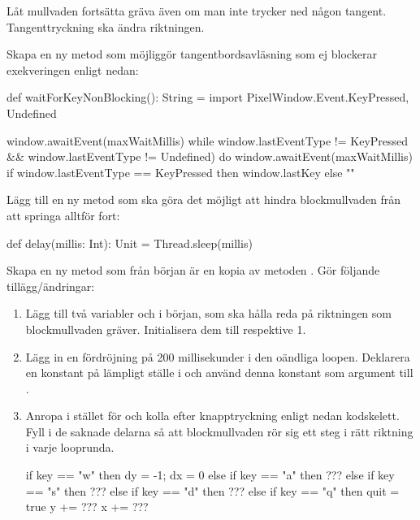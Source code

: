 \Task
Låt mullvaden fortsätta gräva även om man inte trycker ned någon tangent. Tangenttryckning ska ändra riktningen.

\Subtask
Skapa en ny metod  som möjliggör tangentbordsavläsning som ej blockerar exekveringen enligt nedan:

\begin{Code}
  def waitForKeyNonBlocking(): String  = 
    import PixelWindow.Event.{KeyPressed, Undefined}

    window.awaitEvent(maxWaitMillis)
    while 
      window.lastEventType != KeyPressed  &&
      window.lastEventType != Undefined) 
    do window.awaitEvent(maxWaitMillis)
    if window.lastEventType == KeyPressed then window.lastKey else ""
\end{Code}

\Subtask
Lägg till en ny metod  som ska göra det möjligt att hindra blockmullvaden från att springa alltför fort:
\begin{Code}
  def delay(millis: Int): Unit = Thread.sleep(millis)
\end{Code}


\Subtask
Skapa en ny metod  som från början är en kopia av metoden . Gör följande tillägg/ändringar:
\begin{enumerate}

\item Lägg till två variabler  och  i början, som ska hålla reda på riktningen som blockmullvaden gräver. Initialisera dem till  respektive {1}.

\item Lägg in en fördröjning på 200 millisekunder i den oändliga loopen. Deklarera en konstant  på lämpligt ställe i  och använd denna konstant som argument till .

\item Anropa  i stället för  och kolla efter knapptryckning enligt nedan kodskelett. Fyll i de saknade delarna så att blockmullvaden rör sig ett steg i rätt riktning i varje looprunda.
\begin{Code}
      if      key == "w" then { dy = -1; dx = 0 }
      else if key == "a" then { ??? }
      else if key == "s" then { ??? }
      else if key == "d" then { ??? }
      else if key == "q" then { quit = true }
      y += ???
      x += ???
\end{Code}


%

\end{enumerate}

